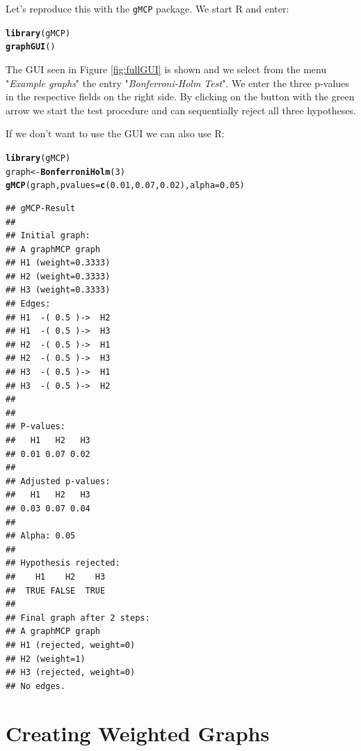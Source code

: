 \documentclass[a4paper, 10pt]{article}\usepackage[]{graphicx}\usepackage[]{color}
\makeatletter
\newcommand{\hlnum}[1]{\textcolor[rgb]{0.686,0.059,0.569}{#1}}%
\newcommand{\hlstd}[1]{\textcolor[rgb]{0.345,0.345,0.345}{#1}}%
\newcommand{\hlkwb}[1]{\textcolor[rgb]{0.69,0.353,0.396}{#1}}%
\newcommand{\hlkwc}[1]{\textcolor[rgb]{0.333,0.667,0.333}{#1}}%
\newcommand{\hlkwd}[1]{\textcolor[rgb]{0.737,0.353,0.396}{\textbf{#1}}}%
\newenvironment{kframe}{%
 \def\at@end@of@kframe{}%
 \ifinner\ifhmode%
  \def\at@end@of@kframe{\end{minipage}}%
  \begin{minipage}{\columnwidth}%
 \fi\fi%
 \def\FrameCommand##1{\hskip\@totalleftmargin \hskip-\fboxsep
 \colorbox{shadecolor}{##1}\hskip-\fboxsep
     \hskip-\linewidth \hskip-\@totalleftmargin \hskip\columnwidth}%
 \MakeFramed {\advance\hsize-\width
   \@totalleftmargin\z@ \linewidth\hsize
   \@setminipage}}%
 {\par\unskip\endMakeFramed%
 \at@end@of@kframe}
\newenvironment{knitrout}{}{} %
\numberwithin{equation}{section}
\theoremstyle{definition}
\theoremstyle{plain}
\makeatother
\begin{document}
Let's reproduce this with the \texttt{gMCP} package. We start R and enter:

\begin{knitrout}\footnotesize
{}\color{fgcolor}\begin{kframe}
\begin{alltt}
\hlkwd{library}\hlstd{(gMCP)}
\hlkwd{graphGUI}\hlstd{()}
\end{alltt}
\end{kframe}
\end{knitrout}


The GUI seen in Figure \ref{fig:fullGUI} is shown and we select from the
menu "\emph{Example graphs}" the entry "\emph{Bonferroni-Holm Test}".
We enter the three p-values in the respective fields on the right
side.  By clicking on the button with the green arrow we start the
test procedure and can sequentially reject all three hypotheses.

If we don't want to use the GUI we can also use R:

\begin{knitrout}\footnotesize
{}\color{fgcolor}\begin{kframe}
\begin{alltt}
\hlkwd{library}\hlstd{(gMCP)}
\hlstd{graph} \hlkwb{<-} \hlkwd{BonferroniHolm}\hlstd{(}\hlnum{3}\hlstd{)}
\hlkwd{gMCP}\hlstd{(graph,} \hlkwc{pvalues} \hlstd{=} \hlkwd{c}\hlstd{(}\hlnum{0.01}\hlstd{,} \hlnum{0.07}\hlstd{,} \hlnum{0.02}\hlstd{),} \hlkwc{alpha} \hlstd{=} \hlnum{0.05}\hlstd{)}
\end{alltt}
\begin{verbatim}
## gMCP-Result
## 
## Initial graph:
## A graphMCP graph
## H1 (weight=0.3333)
## H2 (weight=0.3333)
## H3 (weight=0.3333)
## Edges:
## H1  -( 0.5 )->  H2 
## H1  -( 0.5 )->  H3 
## H2  -( 0.5 )->  H1 
## H2  -( 0.5 )->  H3 
## H3  -( 0.5 )->  H1 
## H3  -( 0.5 )->  H2 
## 
## 
## P-values:
##   H1   H2   H3 
## 0.01 0.07 0.02 
## 
## Adjusted p-values:
##   H1   H2   H3 
## 0.03 0.07 0.04 
## 
## Alpha: 0.05 
## 
## Hypothesis rejected:
##    H1    H2    H3 
##  TRUE FALSE  TRUE 
## 
## Final graph after 2 steps:
## A graphMCP graph
## H1 (rejected, weight=0)
## H2 (weight=1)
## H3 (rejected, weight=0)
## No edges.
\end{verbatim}
\end{kframe}
\end{knitrout}


\section{Creating Weighted Graphs}
\end{document}
